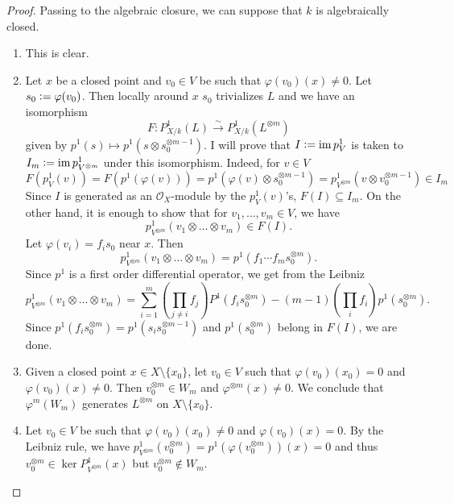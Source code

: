 \documentclass[a4paper,12pt]{amsart}
\numberwithin{equation}{section}
\newcommand{\defeq}{\vcentcolon=}
\DeclareMathOperator{\im}{\operatorname{im}}
\renewcommand{\_}{\rule{0.25cm}{0.4pt}}
\begin{document}
\begin{proof}
    Passing to the algebraic closure, we can suppose that $k$ is algebraically closed.
    \begin{enumerate}
        \item This is clear.
        \item Let $x$ be a closed point and $v_{0}\in V$ be such that $\varphi(v_{0})(x)\neq 0$. Let $s_{0}\defeq \varphi(v_{0})$. Then locally around $x$ $s_{0}$ trivializes $L$ and we have an isomorphism
        \[
        F\colon P^{1}_{X/k}(L)\xrightarrow{\sim} P^{1}_{X/k}(L^{\otimes m})
        \]
        given by $p^{1}(s)\mapsto p^{1}(s\otimes s_{0}^{\otimes m-1})$. I will prove that $I\defeq \im p^{1}_{V}$ is taken to $I_{m}\defeq \im p^{1}_{V^{\otimes m}}$ under this isomorphism. Indeed, for $v\in V$
        \[
        F(p^{1}_{V}(v))=F(p^{1}(\varphi(v)))=p^{1}(\varphi(v)\otimes s_{0}^{\otimes m-1})=p^{1}_{V^{\otimes m}}(v\otimes v_{0}^{\otimes m-1})\in I_{m}
        \]
        Since $I$ is generated as an $\mathcal{O}_{X}$-module by the $p^{1}_{V}(v)$'s, $F(I)\subseteq I_{m}$. On the other hand, it is enough to show that for $v_{1},\dots, v_{m}\in V$, we have
        \[
        p^{1}_{V^{\otimes m}}(v_{1}\otimes\dots\otimes v_{m})\in F(I).
        \]
        Let $\varphi(v_{i})=f_{i}s_{0}$ near $x$. Then
        \[
        p^{1}_{V^{\otimes m}}(v_{1}\otimes\dots\otimes v_{m})=p^{1}(f_{1}\cdots f_{m}s_{0}^{\otimes m}).
        \]
        Since $p^{1}$ is a first order differential operator, we get from the Leibniz
        \[
        p^{1}_{V^{\otimes m}}(v_{1}\otimes\dots\otimes v_{m})=\sum_{i=1}^{m}\left(\prod_{j\neq i}f_{j}\right)P^{1}(f_{i}s_{0}^{\otimes m})-(m-1)\left(\prod_{i}f_{i}\right)p^{1}(s_{0}^{\otimes m}).
        \]
        Since $p^{1}(f_{i}s_{0}^{\otimes m})=p^{1}(s_{i}s_{0}^{\otimes m-1})$ and $p^{1}(s_{0}^{\otimes m})$ belong in $F(I)$, we are done.
        \item Given a closed point $x\in X\setminus\{x_{0}\}$, let $v_{0}\in V$ such that $\varphi(v_{0})(x_{0})=0$ and $\varphi(v_{0})(x)\neq 0$. Then $v_{0}^{\otimes m}\in W_{m}$ and $\varphi^{\otimes m}(x)\neq 0$. We conclude that $\varphi^{m}(W_{m})$ generates $L^{\otimes m}$ on $X\setminus \{x_{0}\}$.
        \item Let $v_{0}\in V$ be such that $\varphi(v_{0})(x_0)\neq 0$ and $\varphi(v_{0})(x)= 0$. By the Leibniz rule, we have $p^{1}_{V^{\otimes m}}(v_{0}^{\otimes m})=p^{1}(\varphi(v_{0}^{\otimes m}))(x)=0$ and thus $v_{0}^{\otimes m}\in \ker P^{1}_{V^{\otimes m}}(x)$ but $v_{0}^{\otimes m}\not\in W_{m}$.
    \end{enumerate}
\end{proof}
\end{document}
